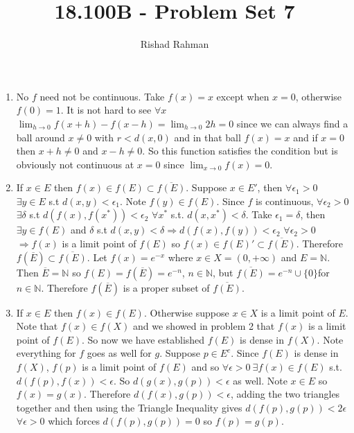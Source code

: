 \documentclass{article}
\begin{document}
\setlength{\abovedisplayskip}{0pt}
\setlength{\belowdisplayskip}{0pt}
\setlength{\abovedisplayshortskip}{0pt}
\setlength{\belowdisplayshortskip}{0pt}
\title{18.100B - Problem Set 7}
\author{Rishad Rahman}
\date{}
\maketitle
\begin{enumerate}
\item No $f$ need not be continuous. Take $f(x) = x$ except when $x=0$, otherwise $f(0)=1$. It is not hard to see $\forall x$ $\displaystyle\lim_{h\rightarrow 0} f(x+h) - f(x-h) = \displaystyle\lim_{h\rightarrow 0} 2h = 0$ since we can always find a ball around $x\neq0$ with $r< d(x, 0)$ and in that ball $f(x)=x$ and if $x=0$ then $x+h\neq 0$ and $x-h\neq 0$. So this function satisfies the condition but is obviously not continuous at $x=0$ since $\displaystyle\lim_{x\rightarrow 0} f(x) = 0$.
\item If $x\in E$ then $f(x)\in f(E)\subset \overline{f(E)}$. Suppose $x\in E'$, then $\forall \epsilon_1 > 0$ $\exists y \in E$ s.t $d(x,y) < \epsilon_1$. Note $f(y)\in f(E)$. Since $f$ is continuous, $\forall\epsilon_2 > 0$ $\exists\delta$ s.t $d(f(x), f(x^*))<\epsilon_2$ $\forall x^*$ s.t. $d(x, x^*) < \delta$. Take $\epsilon_1 = \delta$, then $\exists y\in f(E)$ and $\delta$ s.t $d(x,y)<\delta\Rightarrow d(f(x),f(y)) <\epsilon_2$ $\forall \epsilon_2 > 0$ $\Rightarrow f(x)$ is a limit point of $f(E)$ so $f(x) \in f(E)' \subset \overline{f(E)}$. Therefore $f(\overline{E})\subset\overline{f(E)}$. Let $f(x) = e^{-x}$ where $x\in X = (0, +\infty)$ and $E=\mathbb{N}$. Then $\overline{E} = \mathbb{N}$ so $f(E) = f(\overline{E})= e^{-n}$, $n\in \mathbb{N}$, but $\overline{f(E)}=e^{-n} \cup \{0\}$for $n\in \mathbb{N}$. Therefore $f(\overline{E})$ is a proper subset of $\overline{f(E)}$.
\setcounter{enumi}{3}
\item If $x\in E$ then $f(x) \in f(E)$. Otherwise suppose $x\in X$ is a limit point of $E$. Note that $f(x) \in f(X)$ and we showed in problem 2 that $f(x)$ is a limit point of $f(E)$. So now we have established $f(E)$ is dense in $f(X)$. Note everything for $f$ goes as well for $g$. Suppose $p\in E^c$. Since $f(E)$ is dense in $f(X)$, $f(p)$ is a limit point of $f(E)$ and so $\forall\epsilon > 0 \ \exists f(x)\in f(E)$ s.t. $d(f(p), f(x)) < \epsilon$. So $d(g(x), g(p)) <\epsilon$ as well. Note $x\in E$ so $f(x)=g(x)$. Therefore $d(f(x), g(p)) < \epsilon$, adding the two triangles together and then using the Triangle Inequality gives $d(f(p), g(p)) < 2\epsilon$ $\forall \epsilon > 0$ which forces $d(f(p), g(p)) = 0$ so $f(p) = g(p)$. 

\end{enumerate}
\end{document}
